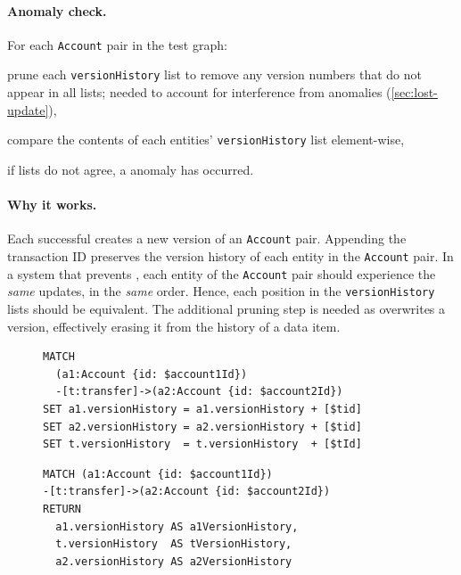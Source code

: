 \paragraph{Anomaly check.}
For each \texttt{Account} pair in the test graph:
\begin{enumerate*}[label={(\roman*)}]
  \item prune each \texttt{versionHistory} list to remove any version numbers 
        that do not appear in all lists; needed to account for interference from
         anomalies (\autoref{sec:lost-update}),
  \item compare the contents of each entities' \texttt{versionHistory} list
        element-wise,
  \item if lists do not agree, a  anomaly has occurred.

\end{enumerate*}

\paragraph{Why it works.}
Each successful  creates a new version of an 
\texttt{Account} pair. Appending the transaction ID preserves the version 
history of each entity in the \texttt{Account} pair. In a system that prevents 
, each entity of the \texttt{Account} pair should experience the 
\emph{same} updates, in the \emph{same} order. Hence, each position in the 
\texttt{versionHistory} lists should be equivalent. The additional pruning step 
is needed as  overwrites a version, effectively erasing it 
from the history of a data item.

\begin{figure}[htb]
  \centering
  \begin{minipage}{0.53\linewidth}
\begin{lstlisting}[language=cypher,label=fig:dw1,caption=\tx{Dirty Write (G0) $T_\mathrm{W}$}.]
MATCH
  (a1:Account {id: $account1Id})
  -[t:transfer]->(a2:Account {id: $account2Id})
SET a1.versionHistory = a1.versionHistory + [$tid]
SET a2.versionHistory = a2.versionHistory + [$tid]
SET t.versionHistory  = t.versionHistory  + [$tId]
\end{lstlisting}
\end{minipage}
\quad
\begin{minipage}{0.431\linewidth}
\begin{lstlisting}[language=cypher,label=fig:dw2,caption=\tx{Dirty Write (G0) $T_\mathrm{R}$}.]
MATCH (a1:Account {id: $account1Id})
-[t:transfer]->(a2:Account {id: $account2Id})
RETURN
  a1.versionHistory AS a1VersionHistory,
  t.versionHistory  AS tVersionHistory,
  a2.versionHistory AS a2VersionHistory
\end{lstlisting}
\end{minipage}
\end{figure}

